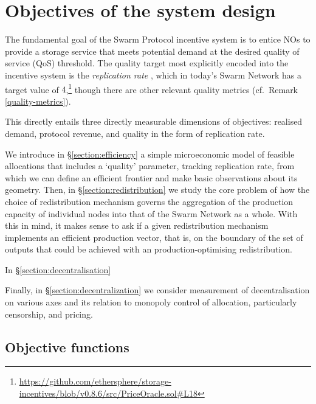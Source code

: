 \newpage

\section{Objectives of the system design}
\label{section:objectives}

The fundamental goal of the Swarm Protocol incentive system is to entice NOs to provide a storage service that meets potential demand at the desired quality of service (QoS) threshold.
%
The quality target most explicitly encoded into the incentive system is the \emph{replication rate} \cite[\S3.4.5]{book-of-swarm}, which in today's Swarm Network has a target value of $4$,\footnote{\url{https://github.com/ethersphere/storage-incentives/blob/v0.8.6/src/PriceOracle.sol\#L18}} though there are other relevant quality metrics (cf.~Remark \ref{quality-metrics}).

This directly entails three directly measurable dimensions of objectives: realised demand, protocol revenue, and quality in the form of replication rate.

We introduce in \S\ref{section:efficiency} a simple microeconomic model of feasible allocations that includes a `quality' parameter, tracking replication rate, from which we can define an efficient frontier and make basic observations about its geometry.
%
Then, in \S\ref{section:redistribution} we study the core problem of how the choice of redistribution mechanism governs the aggregation of the production capacity of individual nodes into that of the Swarm Network as a whole.
%
With this in mind, it makes sense to ask if a given redistribution mechanism implements an efficient production vector, that is, on the boundary of the set of outputs that could be achieved with an production-optimising redistribution.

In \S\ref{section:decentralisation}


Finally, in \S\ref{section:decentralization} we consider measurement of decentralisation on various axes and its relation to monopoly control of allocation, particularly censorship, and pricing.

\subsection{Objective functions}

